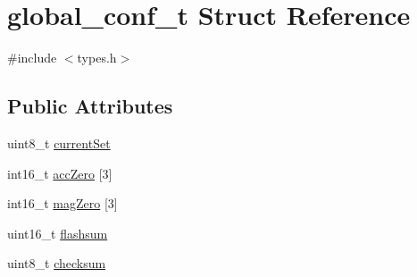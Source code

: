 \hypertarget{structglobal__conf__t}{\section{global\-\_\-conf\-\_\-t Struct Reference}
\label{structglobal__conf__t}
}


{\ttfamily \#include $<$types.\-h$>$}

\subsection*{Public Attributes}
\begin{DoxyCompactItemize}
\item 
uint8\-\_\-t \hyperlink{structglobal__conf__t_ac46db6f8408cc97788e37669d8c7ae94}{current\-Set}
\item 
int16\-\_\-t \hyperlink{structglobal__conf__t_abb838b060d217283eb6c1a722eb0a239}{acc\-Zero} \mbox{[}3\mbox{]}
\item 
int16\-\_\-t \hyperlink{structglobal__conf__t_a5867dd42f729dd56b83914f38192a627}{mag\-Zero} \mbox{[}3\mbox{]}
\item 
uint16\-\_\-t \hyperlink{structglobal__conf__t_a1d3fb9a6a90e8c3991e12d4e657c144c}{flashsum}
\item 
uint8\-\_\-t \hyperlink{structglobal__conf__t_a1cc054737dfa05625197ca539b112f6f}{checksum}
\end{DoxyCompactItemize}


